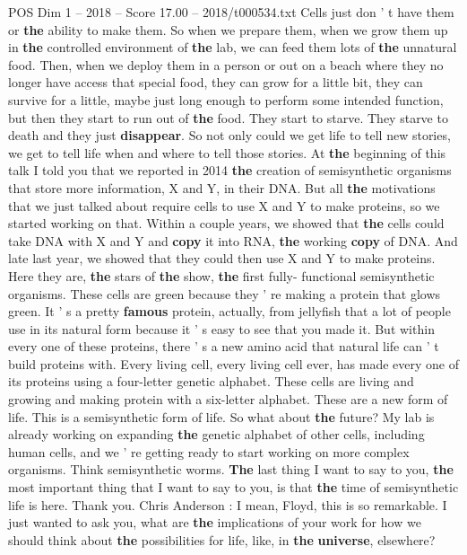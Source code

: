 \begin{textsample}{POS Dim 1 – 2018 – Score 17.00 – 2018/t000534.txt}
Cells just don ' t have them or \textbf{the} ability to make them.
So when we prepare them, when we grow them up in \textbf{the} controlled environment of \textbf{the} lab, we can feed them lots of \textbf{the} unnatural food.
Then, when we deploy them in a person or out on a beach where they no longer have access that special food, they can grow for a little bit, they can survive for a little, maybe just long enough to perform some intended function, but then they start to run out of \textbf{the} food.
They start to starve.
They starve to death and they just \textbf{disappear}.
So not only could we get life to tell new stories, we get to tell life when and where to tell those stories.
At \textbf{the} beginning of this talk I told you that we reported in 2014 \textbf{the} creation of semisynthetic organisms that store more information, X and Y, in their DNA.
But all \textbf{the} motivations that we just talked about require cells to use X and Y to make proteins, so we started working on that.
Within a couple years, we showed that \textbf{the} cells could take DNA with X and Y and \textbf{copy} it into RNA, \textbf{the} working \textbf{copy} of DNA.
And late last year, we showed that they could then use X and Y to make proteins.
Here they are, \textbf{the} stars of \textbf{the} show, \textbf{the} first fully- functional semisynthetic organisms.
These cells are green because they ' re making a protein that glows green.
It ' s a pretty \textbf{famous} protein, actually, from jellyfish that a lot of people use in its natural form because it ' s easy to see that you made it.
But within every one of these proteins, there ' s a new amino acid that natural life can ' t build proteins with.
Every living cell, every living cell ever, has made every one of its proteins using a four-letter genetic alphabet.
These cells are living and growing and making protein with a six-letter alphabet.
These are a new form of life.
This is a semisynthetic form of life.
So what about \textbf{the} future?
My lab is already working on expanding \textbf{the} genetic alphabet of other cells, including human cells, and we ' re getting ready to start working on more complex organisms.
Think semisynthetic worms. \textbf{The} last thing I want to say to you, \textbf{the} most important thing that I want to say to you, is that \textbf{the} time of semisynthetic life is here.
Thank you.
Chris Anderson : I mean, Floyd, this is so remarkable.
I just wanted to ask you, what are \textbf{the} implications of your work for how we should think about \textbf{the} possibilities for life, like, in \textbf{the} \textbf{universe}, elsewhere?

\end{textsample}
